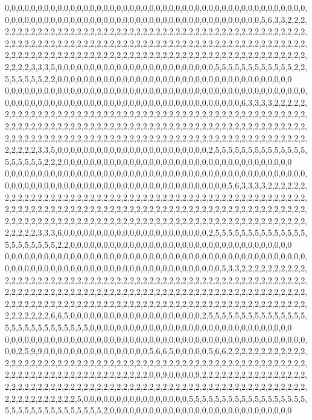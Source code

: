 0,0,0,0,0,0,0,0,0,0,0,0,0,0,0,0,0,0,0,0,0,0,0,0,0,0,0,0,0,0,0,0,0,0,0,0,0,0,0,0,0,0,0,0,0,0,0,0,0,0,0,0,0,0,0,0,0,0,0,0,0,0,0,0,0,0,0,0,0,0,0,0,0,0,0,0,0,0,0,0,0,0,0,0,0,5,6,3,3,2,2,2,2,2,2,2,2,2,2,2,2,2,2,2,2,2,2,2,2,2,2,2,2,2,2,2,2,2,2,2,2,2,2,2,2,2,2,2,2,2,2,2,2,2,2,2,2,2,2,2,2,2,2,2,2,2,2,2,2,2,2,2,2,2,2,2,2,2,2,2,2,2,2,2,2,2,2,2,2,2,2,2,2,2,2,2,2,2,2,2,2,2,2,2,2,2,2,2,2,2,2,2,2,2,2,2,2,2,2,2,2,2,2,2,2,2,2,2,2,2,2,2,2,2,2,2,2,2,2,2,2,2,2,2,2,2,2,2,2,2,2,2,2,2,3,3,3,5,0,0,0,0,0,0,0,0,0,0,0,0,0,0,0,0,0,0,0,0,0,0,0,0,5,5,5,5,5,5,5,5,5,5,5,5,2,2,5,5,5,5,5,5,2,2,0,0,0,0,0,0,0,0,0,0,0,0,0,0,0,0,0,0,0,0,0,0,0,0,0,0,0,0,0,0,0,0,0,0,0,0
0,0,0,0,0,0,0,0,0,0,0,0,0,0,0,0,0,0,0,0,0,0,0,0,0,0,0,0,0,0,0,0,0,0,0,0,0,0,0,0,0,0,0,0,0,0,0,0,0,0,0,0,0,0,0,0,0,0,0,0,0,0,0,0,0,0,0,0,0,0,0,0,0,0,0,0,0,0,0,0,0,0,6,3,3,3,3,2,2,2,2,2,2,2,2,2,2,2,2,2,2,2,2,2,2,2,2,2,2,2,2,2,2,2,2,2,2,2,2,2,2,2,2,2,2,2,2,2,2,2,2,2,2,2,2,2,2,2,2,2,2,2,2,2,2,2,2,2,2,2,2,2,2,2,2,2,2,2,2,2,2,2,2,2,2,2,2,2,2,2,2,2,2,2,2,2,2,2,2,2,2,2,2,2,2,2,2,2,2,2,2,2,2,2,2,2,2,2,2,2,2,2,2,2,2,2,2,2,2,2,2,2,2,2,2,2,2,2,2,2,2,2,2,2,2,2,2,2,2,2,2,2,2,2,2,3,3,5,0,0,0,0,0,0,0,0,0,0,0,0,0,0,0,0,0,0,0,0,0,0,0,2,5,5,5,5,5,5,5,5,5,5,5,5,5,5,5,5,5,5,5,5,2,2,2,0,0,0,0,0,0,0,0,0,0,0,0,0,0,0,0,0,0,0,0,0,0,0,0,0,0,0,0,0,0,0,0,0,0,0
0,0,0,0,0,0,0,0,0,0,0,0,0,0,0,0,0,0,0,0,0,0,0,0,0,0,0,0,0,0,0,0,0,0,0,0,0,0,0,0,0,0,0,0,0,0,0,0,0,0,0,0,0,0,0,0,0,0,0,0,0,0,0,0,0,0,0,0,0,0,0,0,0,0,0,0,0,0,0,0,5,6,3,3,3,3,2,2,2,2,2,2,2,2,2,2,2,2,2,2,2,2,2,2,2,2,2,2,2,2,2,2,2,2,2,2,2,2,2,2,2,2,2,2,2,2,2,2,2,2,2,2,2,2,2,2,2,2,2,2,2,2,2,2,2,2,2,2,2,2,2,2,2,2,2,2,2,2,2,2,2,2,2,2,2,2,2,2,2,2,2,2,2,2,2,2,2,2,2,2,2,2,2,2,2,2,2,2,2,2,2,2,2,2,2,2,2,2,2,2,2,2,2,2,2,2,2,2,2,2,2,2,2,2,2,2,2,2,2,2,2,2,2,2,2,2,2,2,2,2,2,2,2,2,2,3,3,3,6,0,0,0,0,0,0,0,0,0,0,0,0,0,0,0,0,0,0,0,0,0,0,2,5,5,5,5,5,5,5,5,5,5,5,5,5,5,5,5,5,5,5,5,5,5,2,2,0,0,0,0,0,0,0,0,0,0,0,0,0,0,0,0,0,0,0,0,0,0,0,0,0,0,0,0,0,0,0,0,0,0
0,0,0,0,0,0,0,0,0,0,0,0,0,0,0,0,0,0,0,0,0,0,0,0,0,0,0,0,0,0,0,0,0,0,0,0,0,0,0,0,0,0,0,0,0,0,0,0,0,0,0,0,0,0,0,0,0,0,0,0,0,0,0,0,0,0,0,0,0,0,0,0,0,0,0,0,0,0,0,5,3,3,2,2,2,2,2,2,2,2,2,2,2,2,2,2,2,2,2,2,2,2,2,2,2,2,2,2,2,2,2,2,2,2,2,2,2,2,2,2,2,2,2,2,2,2,2,2,2,2,2,2,2,2,2,2,2,2,2,2,2,2,2,2,2,2,2,2,2,2,2,2,2,2,2,2,2,2,2,2,2,2,2,2,2,2,2,2,2,2,2,2,2,2,2,2,2,2,2,2,2,2,2,2,2,2,2,2,2,2,2,2,2,2,2,2,2,2,2,2,2,2,2,2,2,2,2,2,2,2,2,2,2,2,2,2,2,2,2,2,2,2,2,2,2,2,2,2,2,2,2,2,2,2,2,2,2,6,6,5,0,0,0,0,0,0,0,0,0,0,0,0,0,0,0,0,0,0,0,0,2,5,5,5,5,5,5,5,5,5,5,5,5,5,5,5,5,5,5,5,5,5,5,5,5,5,5,5,5,0,0,0,0,0,0,0,0,0,0,0,0,0,0,0,0,0,0,0,0,0,0,0,0,0,0,0,0,0,0,0
0,0,0,0,0,0,0,0,0,0,0,0,0,0,0,0,0,0,0,0,0,0,0,0,0,0,0,0,0,0,0,0,0,0,0,0,0,0,0,0,0,0,0,0,0,0,0,0,2,5,9,9,0,0,0,0,0,0,0,0,0,0,0,0,0,0,0,0,5,6,6,5,0,0,0,0,0,5,6,6,2,2,2,2,2,2,2,2,2,2,2,2,2,2,2,2,2,2,2,2,2,2,2,2,2,2,2,2,2,2,2,2,2,2,2,2,2,2,2,2,2,2,2,2,2,2,2,2,2,2,2,2,2,2,2,2,2,2,2,2,2,2,2,2,2,2,2,2,2,2,2,2,2,2,2,2,2,2,2,2,0,0,9,0,0,0,0,9,2,2,2,2,2,2,2,2,2,2,2,2,2,2,2,2,2,2,2,2,2,2,2,2,2,2,2,2,2,2,2,2,2,2,2,2,2,2,2,2,2,2,2,2,2,2,2,2,2,2,2,2,2,2,2,2,2,2,2,2,2,2,2,2,2,2,2,2,2,2,2,2,2,5,0,0,0,0,0,0,0,0,0,0,0,0,0,0,0,0,5,5,5,5,5,5,5,5,5,5,5,5,5,5,5,5,5,5,5,5,5,5,5,5,5,5,5,5,5,5,5,5,5,2,0,0,0,0,0,0,0,0,0,0,0,0,0,0,0,0,0,0,0,0,0,0,0,0,0,0,0,0
